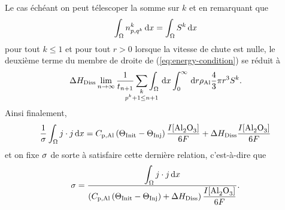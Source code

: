 Le cas échéant on peut télescoper la somme sur $k$ et en remarquant que
\begin{equation*}
  \int_\Omega n_{p,q^k}^k\,\mathrm dx = \int_\Omega S^k\,\mathrm dx
\end{equation*}
pour tout $k \leq 1$ et pour tout $r > 0$ lorsque la vitesse de chute
est nulle, le deuxième terme du membre de droite de
(\ref{eq:energy-condition}) se réduit à
\begin{equation*}
  {\aluminadissolutionenthalpy}\lim_{n\to\infty}\frac{1}{t_{n+1}}\sum_{\mathclap{\substack{k\\ p^k +
  1 \leq n + 1}}}\int_\Omega\intd{x}\int_0^\infty\intd{r}\aluminadensity
  \frac{4}{3}\pi r^3 S^k.
\end{equation*}
Ainsi finalement,
\begin{equation*}
  \frac{1}{\sigma}\int_\Omega j\cdot j\intd{x}
  =\aluminahc\parent{\tinit-\tinj}\frac{I[\cee{Al2O3}]}{6F} + {\aluminadissolutionenthalpy}\frac{I[\cee{Al2O3}]}{6F}
\end{equation*}
et on fixe $\sigma$ de sorte à satisfaire cette dernière
relation, c'est-à-dire que
\begin{equation}\label{eq:conductivity-condition}
  \conductivity = \frac{\displaystyle\int_\Omega j\cdot j\intd{x}}{\parent{\aluminahc\parent{\tinit-\tinj} + {\aluminadissolutionenthalpy} }
    \displaystyle\frac{I[\cee{Al2O3}]}{6F}}.
\end{equation}

